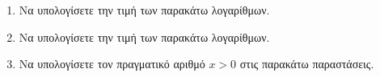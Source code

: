 \documentclass[twoside,nofonts,internet]{askhseis}
\begin{document}
\begin{enumerate}
\begin{multicols}{3}
\end{multicols}
\item Να υπολογίσετε την τιμή των παρακάτω λογαρίθμων.
\begin{multicols}{3}
\end{multicols}
\item Να υπολογίσετε την τιμή των παρακάτω λογαρίθμων.
\begin{multicols}{3}
\end{multicols}
\item Να υπολογίσετε τον πραγματικό αριθμό $ x>0 $ στις παρακάτω παραστάσεις.
\begin{multicols}{2}
\end{multicols}
\end{enumerate}
\end{document}
